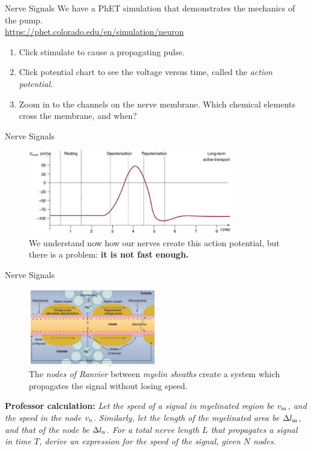 \documentclass{beamer}
\begin{document}
\begin{frame}{Nerve Signals}
We have a PhET simulation that demonstrates the mechanics of the pump. \\ \vspace{1cm}
\url{https://phet.colorado.edu/en/simulation/neuron}
\begin{enumerate}
\item Click stimulate to cause a propagating pulse.
\item Click potential chart to see the voltage versus time, called the \textit{action potential.}
\item Zoom in to the channels on the nerve membrane.  Which chemical elements cross the membrane, and when?
\end{enumerate}
\end{frame}

\begin{frame}{Nerve Signals}
\begin{figure}
\centering
\includegraphics[width=0.8\textwidth]{figures/nerve3.png}
\caption{\label{fig:nerve3} We understand now how our nerves create this action potential, but there is a problem: \textbf{it is not fast enough.}}
\end{figure}
\end{frame}

\begin{frame}{Nerve Signals}
\begin{figure}
\centering
\includegraphics[width=0.5\textwidth]{figures/nerve5.png}
\caption{\label{fig:nerve4} The \textit{nodes of Ranvier} between \textit{myelin sheaths} create a system which propagates the signal without losing speed.}
\end{figure}
\small
\textbf{Professor calculation:} \textit{Let the speed of a signal in myelinated region be $v_{\rm m}$, and the speed in the node $v_{\rm n}$. Similarly, let the length of the myelinated area be $\Delta l_{\rm m}$, and that of the node be $\Delta l_{\rm n}$.  For a total nerve length $L$ that propagates a signal in time $T$, derive an expression for the speed of the signal, given $N$ nodes.}
\end{frame}
\end{document}
